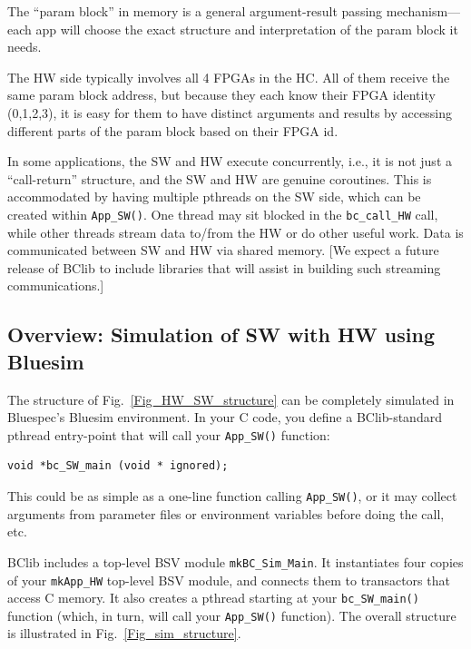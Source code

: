 \documentclass[twoside,letterpaper,11pt]{article}
\begin{document}
The ``param block'' in memory is a general argument-result passing
mechanism---each app will choose the exact structure and
interpretation of the param block it needs.
 
The HW side typically involves all 4 FPGAs in the HC.  All of them
receive the same param block address, but because they each know their
FPGA identity (0,1,2,3), it is easy for them to have distinct
arguments and results by accessing different parts of the param block
based on their FPGA id.

In some applications, the SW and HW execute concurrently, i.e., it is
not just a ``call-return'' structure, and the SW and HW are genuine
coroutines.  This is accommodated by having multiple pthreads on the
SW side, which can be created within \verb|App_SW()|.  One thread may
sit blocked in the \verb|bc_call_HW| call, while other threads stream
data to/from the HW or do other useful work.  Data is communicated
between SW and HW via shared memory.  [We expect a future release
of BClib to include libraries that will assist in building such
streaming communications.]


\subsection{Overview: Simulation of SW with HW using Bluesim}

\label{sec_overview_sim}
 
The structure of Fig.~\ref{Fig_HW_SW_structure} can be completely
simulated in Bluespec's Bluesim environment.  In your C code, you
define a BClib-standard pthread entry-point that will call your
\verb|App_SW()| function:
\begin{Verbatim}[frame=single] 
    void *bc_SW_main (void * ignored);
\end{Verbatim}

This could be as simple as a one-line function calling
\verb|App_SW()|, or it may collect arguments from parameter files or
environment variables before doing the call, etc.

BClib includes a top-level BSV module \verb|mkBC_Sim_Main|.  It
instantiates four copies of your \verb|mkApp_HW| top-level BSV module,
and connects them to transactors that access C memory.  It also
creates a pthread starting at your \verb|bc_SW_main()| function
(which, in turn, will call your \verb|App_SW()| function).  The
overall structure is illustrated in Fig.~\ref{Fig_sim_structure}.
\end{document}

